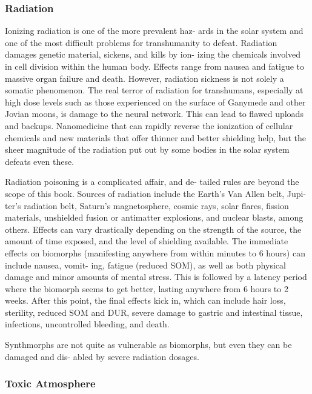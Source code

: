 \subsubsection{Radiation}

Ionizing radiation is one of the more prevalent haz-
ards in the solar system and one of the most difficult 
problems for transhumanity to defeat. Radiation 
damages genetic material, sickens, and kills by ion-
izing the chemicals involved in cell division within the 
human body. Effects range from nausea and fatigue to 
massive organ failure and death. However, radiation 
sickness is not solely a somatic phenomenon. The real 
terror of radiation for transhumans, especially at high 
dose levels such as those experienced on the surface of 
Ganymede and other Jovian moons, is damage to the 
neural network. This can lead to flawed uploads and 
backups. Nanomedicine that can rapidly reverse the 
ionization of cellular chemicals and new materials that 
offer thinner and better shielding help, but the sheer 
magnitude of the radiation put out by some bodies in 
the solar system defeats even these.

Radiation poisoning is a complicated affair, and de-
tailed rules are beyond the scope of this book. Sources 
of radiation include the Earth's Van Allen belt, Jupi-
ter's radiation belt, Saturn's magnetosphere, cosmic 
rays, solar flares, fission materials, unshielded fusion 
or antimatter explosions, and nuclear blasts, among 
others. Effects can vary drastically depending on the 
strength of the source, the amount of time exposed, 
and the level of shielding available. The immediate 
effects on biomorphs (manifesting anywhere from 
within minutes to 6 hours) can include nausea, vomit-
ing, fatigue (reduced SOM), as well as both physical 
damage and minor amounts of mental stress. This 
is followed by a latency period where the biomorph 
seems to get better, lasting anywhere from 6 hours 
to 2 weeks. After this point, the final effects kick in, 
which can include hair loss, sterility, reduced SOM 
and DUR, severe damage to gastric and intestinal 
tissue, infections, uncontrolled bleeding, and death.

Synthmorphs are not quite as vulnerable as 
biomorphs, but even they can be damaged and dis-
abled by severe radiation dosages.

\subsubsection{Toxic Atmosphere}

